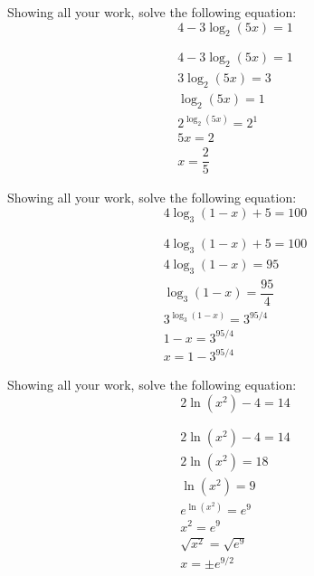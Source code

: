 \documentclass[11pt,letterpaper]{article}
\begin{document}

 Showing all your work, solve the following equation:
	\[
	4 - 3\log_2(5x)= 1
	\] \pspace

\sol 
	\begin{gather*}
	4 - 3\log_2(5x)= 1 \\[0.3cm]
	3 \log_2(5x)= 3 \\[0.3cm]
	\log_2(5x)= 1 \\[0.3cm]
	2^{\log_2(5x)}= 2^1 \\[0.3cm]
	5x= 2 \\[0.3cm]
	x= \dfrac{2}{5}
	\end{gather*}



\newpage



 Showing all your work, solve the following equation:
	\[
	4 \log_3(1 - x) + 5= 100
	\] \pspace

\sol 
	\begin{gather*}
	4 \log_3(1 - x) + 5= 100 \\[0.3cm]
	4 \log_3(1 - x)= 95 \\[0.3cm]
	\log_3(1 - x)= \dfrac{95}{4} \\[0.3cm]
	3^{\log_3(1 - x)}= 3^{95/4} \\[0.3cm]
	1 - x= 3^{95/4} \\[0.3cm]
	x= 1 - 3^{95/4}
	\end{gather*} 



\newpage



 Showing all your work, solve the following equation:
	\[
	2 \ln(x^2) - 4= 14
	\] \pspace

\sol 
	\begin{gather*}
	2 \ln(x^2) - 4= 14 \\[0.3cm]
	2 \ln(x^2)= 18 \\[0.3cm]
	\ln(x^2)= 9 \\[0.3cm]
	e^{\ln(x^2)}= e^9 \\[0.3cm]
	x^2= e^9 \\[0.3cm]
	\sqrt{x^2}= \sqrt{e^9} \\[0.3cm]
	x= \pm e^{9/2}
	\end{gather*}
\end{document}
